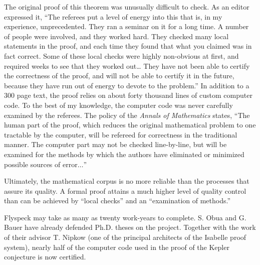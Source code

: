 \documentclass{llncs}
\begin{document}
The original proof of this theorem was unusually difficult
to check.  As an editor expressed it, ``The referees put a level of energy into this that is, in my experience, unprecedented. They ran a seminar on it for a long time. A number of people were involved, and they worked hard. They checked many local statements in the proof, and each time they found that what you claimed was in fact correct. Some of these local checks were highly non-obvious at first, and required weeks to see that they worked out\ldots
They have not been able to certify the correctness of the proof, 
and will not be able to certify it in the future, because they 
have run out of energy to devote to the problem.''  In addition to
a $300$ page text, the proof relies
on about forty thousand lines of custom computer code.  To the best of my knowledge,
the computer code was
never carefully examined by the referees.
The policy of the {\it Annals of Mathematics}
states, ``The human part of the proof, which reduces the original mathematical problem to one tractable by the computer, will be refereed for correctness in the traditional manner. The computer part may not be checked line-by-line, but will be examined for the methods by which the authors have eliminated or minimized possible sources of error$\ldots$''

Ultimately, the mathematical corpus is no more reliable than the processes
that assure its quality.  A formal proof attains a much
higher level of quality control than can be achieved by ``local checks''
and an ``examination of methods.''


Flyspeck may take as many as twenty work-years to complete. S. Obua and G. Bauer have already defended Ph.D. theses 
on the  project.  
Together with the work of
their advisor T. Nipkow (one of the principal architects of the Isabelle proof system), nearly half of the computer code
used in the proof of the Kepler conjecture is now 
certified.


\end{document}
